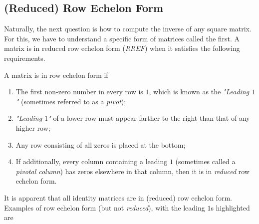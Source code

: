 \subsection{(Reduced) Row Echelon Form}
\label{section:echelon}
Naturally, the next question is how to compute the inverse of any square matrix. For this, we have to understand a specific form of matrices called the  first. A matrix is in reduced row echelon form (\textit{RREF}) when it satisfies the following requirements.
\begin{defn}
\label{defn:rref}
A matrix is in row echelon form if
\begin{enumerate}
\item The first non-zero number in every row is $1$, which is known as the \textit{"Leading $1$"} (sometimes referred to as a \textit{pivot});
\item \textit{"Leading $1$"} of a lower row must appear farther to the right than that of any higher row;
\item Any row consisting of all zeros is placed at the bottom;
\item If additionally, every column containing a leading $1$ (sometimes called a \textit{pivotal column}) has zeros elsewhere in that column, then it is in \textit{reduced} row echelon form.
\end{enumerate}
\end{defn}
It is apparent that all identity matrices are in (reduced) row echelon form. Examples of row echelon form (but not \textit{reduced}), with the leading $1$s highlighted are
